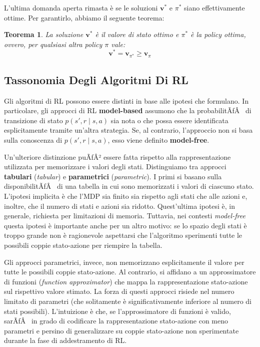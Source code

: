 ﻿\documentclass[11pt, a4paper]{report}
\newtheorem{theorem}{Teorema}
\begin{document}
L'ultima domanda aperta rimasta è se le soluzioni $\bm{v}^*$ e $\pi^*$ siano effettivamente ottime. Per garantirlo, abbiamo il seguente teorema:

\begin{theorem}
La soluzione $\bm{v}^*$ è il valore di stato ottimo e $\pi^*$ è la \emph{policy} ottima, ovvero, per qualsiasi altra \emph{policy} $\pi$ vale:
\begin{equation}
\bm{v}^* = \bm{v}_{\pi^*} \ge \bm{v}_\pi
\end{equation}
\end{theorem}

\subsection{Tassonomia Degli Algoritmi Di RL}

Gli algoritmi di RL possono essere distinti in base alle ipotesi che formulano. In particolare, gli approcci di RL \textbf{model-based} assumono che la probabilitÃƒÂ  di transizione di stato $p(s', r \mid s, a)$ sia nota o che possa essere identificata esplicitamente tramite un'altra strategia. Se, al contrario, l'approccio non si basa sulla conoscenza di $p(s', r \mid s, a)$, esso viene definito \textbf{model-free}.

Un'ulteriore distinzione puÃƒÂ² essere fatta rispetto alla rappresentazione utilizzata per memorizzare i valori degli stati. Distinguiamo tra approcci \textbf{tabulari} (\emph{tabular}) e \textbf{parametrici} (\emph{parametric}). I primi si basano sulla disponibilitÃƒÂ  di una tabella in cui sono memorizzati i valori di ciascuno stato. L'ipotesi implicita è che l'MDP sia finito sia rispetto agli stati che alle azioni e, inoltre, che il numero di stati e azioni sia ridotto. Quest'ultima ipotesi è, in generale, richiesta per limitazioni di memoria. Tuttavia, nei contesti \emph{model-free} questa ipotesi è importante anche per un altro motivo: se lo spazio degli stati è troppo grande non è ragionevole aspettarsi che l'algoritmo sperimenti tutte le possibili coppie stato-azione per riempire la tabella.

Gli approcci parametrici, invece, non memorizzano esplicitamente il valore per tutte le possibili coppie stato-azione. Al contrario, si affidano a un approssimatore di funzioni (\emph{function approximator}) che mappa la rappresentazione stato-azione sul rispettivo valore stimato. La forza di questi approcci risiede nel numero limitato di parametri (che solitamente è significativamente inferiore al numero di stati possibili). L'intuizione è che, se l'approssimatore di funzioni è valido, sarÃƒÂ  in grado di codificare la rappresentazione stato-azione con meno parametri e persino di generalizzare su coppie stato-azione non sperimentate durante la fase di addestramento di RL.
\end{document}
